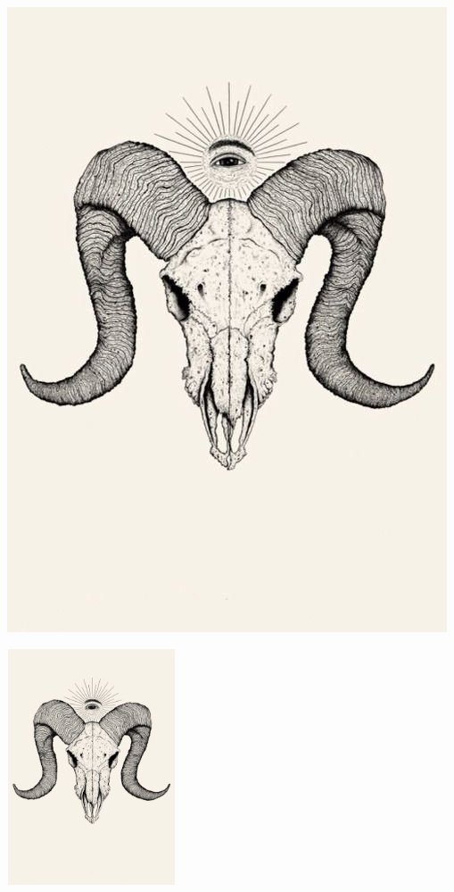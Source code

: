 \documentclass[]{article} %
\begin{document}
        \includegraphics[scale=0.5]{dd70b1b87d300d20fcfaf566f13de977.jpg}

        \includegraphics[width=5cm, height=7cm]{dd70b1b87d300d20fcfaf566f13de977.jpg}
\end{document}
